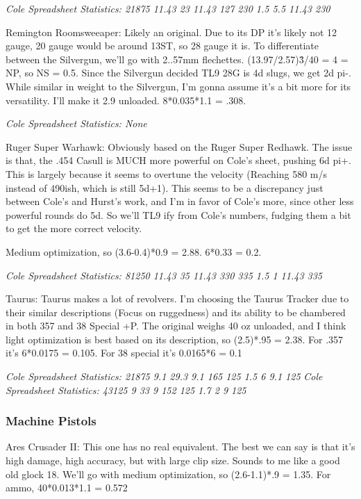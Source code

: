 \begin{multicols*}{2}
	\textit{\textcolor{OliveGreen}{Cole Spreadsheet Statistics: 21875 11.43 23 11.43 127 230 1.5 5.5 11.43 230}}
	
	Remington Roomsweeaper: Likely an original. Due to its DP it's likely not 12 gauge, 20 gauge would be around 13ST, so 28 gauge it is. To differentiate between the Silvergun, we'll go with 2..57mm flechettes. (13.97/2.57)\^3/40 = 4 = NP, so NS = 0.5. Since the Silvergun decided TL9 28G is 4d slugs, we get 2d pi-. While similar in weight to the Silvergun, I'm gonna assume it's a bit more for its versatility. I'll make it 2.9 unloaded. 8*0.035*1.1 = .308.
	
	\textit{\textcolor{OliveGreen}{Cole Spreadsheet Statistics: None}}
	
	Ruger Super Warhawk: Obviously based on the Ruger Super Redhawk. The issue is that, the .454 Casull is MUCH more powerful on Cole's sheet, pushing 6d pi+. This is largely because it seems to overtune the velocity (Reaching 580 m/s instead of 490ish, which is still 5d+1). This seems to be a discrepancy just between Cole's and Hurst's work, and I'm in favor of Cole's more, since other less powerful rounds do 5d. So we'll TL9 ify from Cole's numbers, fudging them a bit to get the more correct velocity.
	
	Medium optimization, so (3.6-0.4)*0.9 = 2.88. 6*0.33 = 0.2. 
	
	\textit{\textcolor{OliveGreen}{Cole Spreadsheet Statistics: 81250 11.43 35 11.43 330 335 1.5 1 11.43 335}}
	
	Taurus: Taurus makes a lot of revolvers. I'm choosing the Taurus Tracker due to their similar descriptions (Focus on ruggedness) and its ability to be chambered in both 357 and 38 Special +P. The original weighs 40 oz unloaded, and I think light optimization is best based on its description, so (2.5)*.95 = 2.38. For .357 it's 6*0.0175 = 0.105. For 38 special it's 0.0165*6 = 0.1
	
	\textit{\textcolor{OliveGreen}{Cole Spreadsheet Statistics: 21875 9.1 29.3 9.1 165 125 1.5 6 9.1 125}}
	\textit{\textcolor{OliveGreen}{Cole Spreadsheet Statistics: 43125 9 33 9 152 125 1.7 2 9 125}}
	
	\subsubsection{Machine Pistols}
	
	Ares Crusader II: This one has no real equivalent. The best we can say is that it's high damage, high accuracy, but with large clip size. Sounds to me like a good old glock 18. We'll go with medium optimization, so (2.6-1.1)*.9 = 1.35. For ammo, 40*0.013*1.1 = 0.572
	

\end{multicols*}

